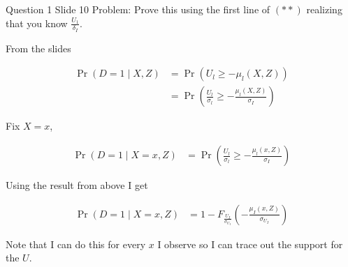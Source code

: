 \documentclass{article}
\begin{document}
\begin{problem}{Question 1 Slide 10}
Problem: Prove this using the first line of $(* *)$ realizing that you know $\frac{U_{1}}{\delta_{I}}$.
\end{problem}
\begin{solution}
From the slides

\begin{align*} 
    \operatorname{Pr}(D=1 \mid X, Z) &=\operatorname{Pr}\left(U_{l} \geq-\mu_{l}(X, Z)\right)\tag{**} \\ &=\operatorname{Pr}\left(\frac{U_l}{\sigma_l}\geq-\frac{\mu_{l}(X, Z)}{\sigma_I}\right)
\end{align*}

Fix $X=x$,

\begin{align*} 
    \operatorname{Pr}(D=1 \mid X=x, Z) 
    &=\operatorname{Pr}\left(\frac{U_l}{\sigma_l}\geq-\frac{\mu_{l}(x, Z)}{\sigma_I}\right) 
\end{align*}

Using the result from above I get

\begin{align*} 
    \operatorname{Pr}(D=1 \mid X=x, Z) 
    &= 1-F_{\frac{U_{I}}{\sigma_{U_{I}}}}\left(-\frac{\mu_{I}(x, Z)}{\sigma_{U_{I}}}\right)
\end{align*}

Note that I can do this for every $x$ I observe so I can trace out the support for the $U$.
\end{solution}


\newpage

\end{document}
